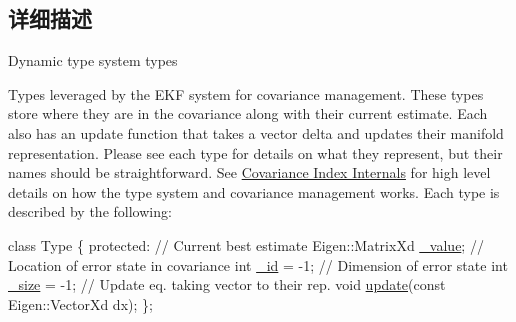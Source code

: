 \subsection{详细描述}
Dynamic type system types 

Types leveraged by the E\+KF system for covariance management. These types store where they are in the covariance along with their current estimate. Each also has an update function that takes a vector delta and updates their manifold representation. Please see each type for details on what they represent, but their names should be straightforward. See \hyperlink{dev-index}{Covariance Index Internals} for high level details on how the type system and covariance management works. Each type is described by the following\+:


\begin{DoxyCode}
\textcolor{keyword}{class }Type \{
\textcolor{keyword}{protected}:
  \textcolor{comment}{// Current best estimate}
  Eigen::MatrixXd \hyperlink{classov__type_1_1Type_a40afb4c94c3d11db860b98c186e22312}{\_value};
  \textcolor{comment}{// Location of error state in covariance}
  \textcolor{keywordtype}{int} \hyperlink{classov__type_1_1Type_adb644d3f30691886f153527a9782a1e0}{\_id} = -1;
  \textcolor{comment}{// Dimension of error state}
  \textcolor{keywordtype}{int} \hyperlink{classov__type_1_1Type_ae7450adb49403a591013e1719ab1e46e}{\_size} = -1;
  \textcolor{comment}{// Update eq. taking vector to their rep.}
  \textcolor{keywordtype}{void} \hyperlink{classov__type_1_1Type_a4e133d50af35f07bd97f73590fe31000}{update}(\textcolor{keyword}{const} Eigen::VectorXd dx);
\};
\end{DoxyCode}
 
